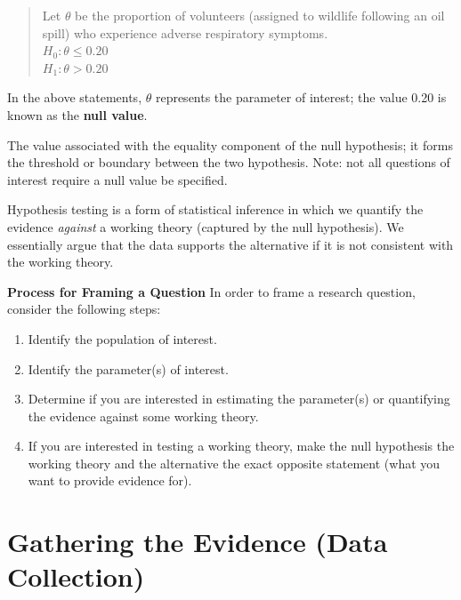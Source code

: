 \documentclass[]{book}
\providecommand{\tightlist}{%
  \setlength{\itemsep}{0pt}\setlength{\parskip}{0pt}}
\theoremstyle{definition}
\theoremstyle{definition}
\theoremstyle{definition}
\theoremstyle{remark}
\let\BeginKnitrBlock\begin \let\EndKnitrBlock\end
\begin{document}
\begin{quote}
Let \(\theta\) be the proportion of volunteers (assigned to wildlife
following an oil spill) who experience adverse respiratory symptoms.\\
\(H_0: \theta \leq 0.20\)\\
\(H_1: \theta > 0.20\)
\end{quote}

In the above statements, \(\theta\) represents the parameter of
interest; the value 0.20 is known as the \textbf{null value}.

\BeginKnitrBlock{definition}[Null Value]
\protect\hypertarget{def:defn-null-value}{}{\label{def:defn-null-value}
{} }The value associated with the equality
component of the null hypothesis; it forms the threshold or boundary
between the two hypothesis. Note: not all questions of interest require
a null value be specified.
\EndKnitrBlock{definition}

\BeginKnitrBlock{rmdkeyidea}
Hypothesis testing is a form of statistical inference in which we
quantify the evidence \emph{against} a working theory (captured by the
null hypothesis). We essentially argue that the data supports the
alternative if it is not consistent with the working theory.
\EndKnitrBlock{rmdkeyidea}

\BeginKnitrBlock{rmdtip}
\textbf{Process for Framing a Question} In order to frame a research
question, consider the following steps:

\begin{enumerate}
\def\labelenumi{\arabic{enumi}.}
\tightlist
\item
  Identify the population of interest.
\item
  Identify the parameter(s) of interest.
\item
  Determine if you are interested in estimating the parameter(s) or
  quantifying the evidence against some working theory.
\item
  If you are interested in testing a working theory, make the null
  hypothesis the working theory and the alternative the exact opposite
  statement (what you want to provide evidence for).
\end{enumerate}
\EndKnitrBlock{rmdtip}

\chapter{Gathering the Evidence (Data Collection)}\label{Data}
\end{document}
